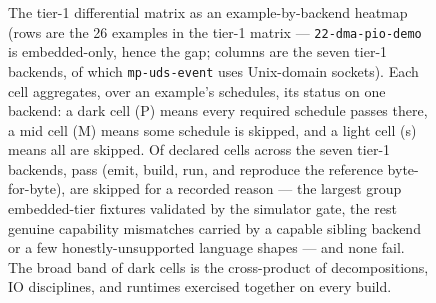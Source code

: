 \begin{figure}[tbp]
  \caption[Tier-1 coverage heatmap]{The tier-1 differential matrix as an
    example-by-backend heatmap (rows are the 26 examples in the tier-1 matrix ---
    \texttt{22-dma-pio-demo} is embedded-only, hence the gap; columns are the
    seven tier-1 backends, of which \texttt{mp-uds-event} uses Unix-domain
    sockets). Each cell aggregates, over an example's schedules, its status on one
    backend: a dark cell (P) means every required schedule passes there, a mid
    cell (M) means some schedule is skipped, and a light cell (s) means all are
    skipped. Of \nmatrixtotal{} declared cells across the seven
    tier-1 backends, \nmatrixpass{} pass (emit, build, run, and reproduce the
    reference byte-for-byte), \nmatrixskip{} are skipped for a recorded reason ---
    the largest group embedded-tier fixtures validated by the simulator gate, the
    rest genuine capability mismatches carried by a capable sibling backend or a
    few honestly-unsupported language shapes --- and none fail. The broad band of
    dark cells is the cross-product of decompositions, IO disciplines, and
    runtimes exercised together on every build.}
  \label{fig:coverage-heatmap}
\end{figure}
